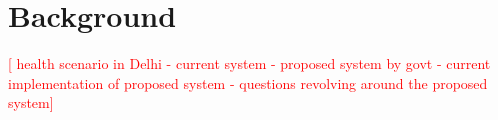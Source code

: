 \section{Background}
\begin{comment}
Build up the context that the reader could read, like a story, to understand more about the problem you’re addressing, the phenomena you are talking about. If the paper is about an internet ban in Bangladesh, tell the story about how the ban was put in place, what was the timeline like, who said what in popular press, and so on. If the research was conducted in the context of an organization of health/outreach workers, talk about the organization, its charter, what it has done/is doing.
\end{comment}
\begin{comment}
With its massive population of over a billion people, India is faced with the logistical challenge of dispensing quality health care to each and every citizen irrespective of geographical location and economic status. Today, even in the capital city of Delhi, there is a vast difference in the level of access and quality of health care received by people from different socio-economic groups.

The Delhi government has proposed an interesting way to tackle this. It is planning to set up a 3-tier system where the lowest tier is a system of ‘Mohalla Clinics’, government clinics in each neighborhood which provide free consultation, tests and medicines. While the existing dispensaries are meant to cater to 50,000 people, each clinic will cater to around 10,000 people in a locality. So far around a hundred clinics have been set up and the government aims to open 1000 such clinics by the end of the year.

According to one doctor I met, the clinics have been set up haphazardly by the government as an immediate response to the crisis. Mohalla clinics are being set up in rented rooms or with pre-made structures around the city. Those running them are doctors coming out of retirement or wanting to give back to society. The government pays the doctors around Rs 30 for every patient they see which is lower than what they would have received at a private practice. The clinics in operation have little in common save the promise to provide quality health care, the facilities available and the staff employed vary.

The two clinics in my area were open only from 9am to 1pm, 6 days a week, during the time many people work. One clinic I visited had a waiting time of around 2 hours while the other had practically no waiting time, though both saw the same number of visitors in a day. At the moment, the clinics are relying on word of mouth to bring new customers. 
*****
\end{comment}
\textcolor{red}{ [
health scenario in Delhi - current system - proposed system by govt - current implementation of proposed system - questions revolving around the proposed system]
}

